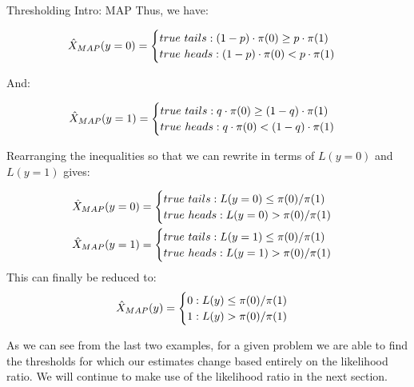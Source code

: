 \begin{exmp}{Thresholding Intro: MAP}{}
Thus, we have:

\begin{align*}
  {\hat{X}_{MAP}} (y=0) =
  \begin{cases}
	true\ tails : (1-p) \cdot \pi(0) \geq p \cdot \pi(1) \\
	true\ heads : (1-p) \cdot \pi(0) < p \cdot \pi(1)
	\end{cases} 
\end{align*}

And:

\begin{align*}
  {\hat{X}_{MAP}} (y=1) =
  \begin{cases}
	true\ tails : q \cdot \pi(0) \geq (1-q) \cdot \pi(1) \\
	true\ heads : q \cdot \pi(0) < (1-q) \cdot \pi(1)
	\end{cases} 
\end{align*}

Rearranging the inequalities so that we can rewrite in terms of \(L(y=0)\) and \(L(y=1)\) gives:

\begin{align*}
  {\hat{X}_{MAP}} (y=0) =
  \begin{cases}
	true\ tails : L(y=0) \leq \pi(0) / \pi(1) \\
	true\ heads : L(y=0) > \pi(0) / \pi(1)	\end{cases} 
\\
  {\hat{X}_{MAP}} (y=1) =
  \begin{cases}
	true\ tails : L(y=1) \leq \pi(0) / \pi(1) \\
	true\ heads : L(y=1) > \pi(0) / \pi(1)
	\end{cases} 
\end{align*}
This can finally be reduced to:
\begin{align*}
  {\hat{X}_{MAP}} (y) =
  \begin{cases}
	0 : L(y) \leq \pi(0) / \pi(1) \\
	1 : L(y) > \pi(0) / \pi(1)	
	\end{cases} 
\end{align*}


\end{exmp}

As we can see from the last two examples, for a given problem we are able to find the thresholds for which our estimates change based entirely on the likelihood ratio. We will continue to make use of the likelihood ratio in the next section.



